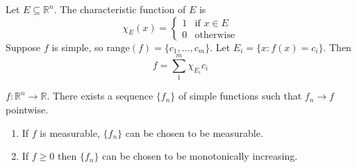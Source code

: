 \documentclass[11pt]{article}
\begin{document}
\begin{example}
    Let $E \subseteq \mathbb{R}^n$. The characteristic function of $E$ is $$\chi_E (x) = \begin{cases} 1 & \text{if } x \in E \\ 0 & \text{otherwise} \end{cases}$$Suppose $f$ is simple, so $\mathrm{range}(f) = \{ c_1, \dots, c_m \}$. Let $E_i = \{ x : f(x) = c_i \}$. Then $$f = \sum_1^m \chi_{E_i} c_i$$
\end{example}

\begin{theorem}
    $f: \mathbb{R}^n \to \mathbb{R}$. There exists a sequence $\{ f_n \}$ of simple functions such that $f_n \to f$ pointwise. \begin{enumerate}
        \item If $f$ is measurable, $\{ f_n \}$ can be chosen to be measurable.
        \item If $f\ge 0$ then $\{ f_n \}$ can be chosen to be monotonically increasing.
    \end{enumerate} 
\end{theorem}
\end{document}
